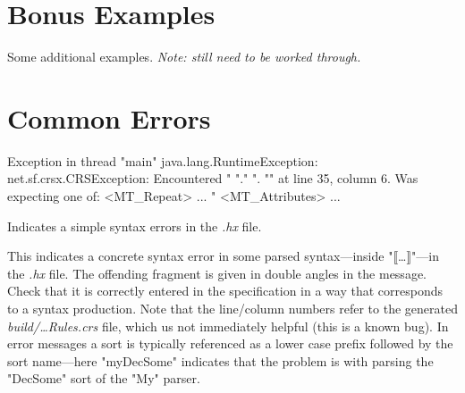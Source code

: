 \documentclass[11pt]{article} %
\begin{document}
\section{Bonus Examples}
\label{app:bonus}

Some additional examples. \emph{Note: still need to be worked through.}

\begin{example}\leavevmode
{}
\end{example}

\begin{example}\leavevmode
{}
\end{example}


\section{Common Errors}
\label{app:errors}

\begin{error}\leavevmode
\begin{code}
Exception in thread "main" java.lang.RuntimeException: net.sf.crsx.CRSException:
 Encountered " "." ". "" at line 35, column 6.
Was expecting one of:
    <MT_Repeat> ...
    "%
    <MT_Attributes> ...
\end{code}
  Indicates a simple syntax errors in the \emph{.hx} file.
\end{error}

\begin{error}\leavevmode
{}
  This indicates a concrete syntax error in some parsed syntax---inside "⟦…⟧"---in the \emph{.hx}
  file. The offending fragment is given in double angles in the message. Check that it is correctly
  entered in the \HAX specification in a way that corresponds to a syntax production. Note that the
  line/column numbers refer to the generated \emph{build/…Rules.crs} file, which us not immediately
  helpful (this is a known bug). In error messages a sort is typically referenced as a lower case
  prefix followed by the sort name---here "myDecSome" indicates that the problem is with parsing the
  "DecSome" sort of the "My" parser.
\end{error}
\end{document}
